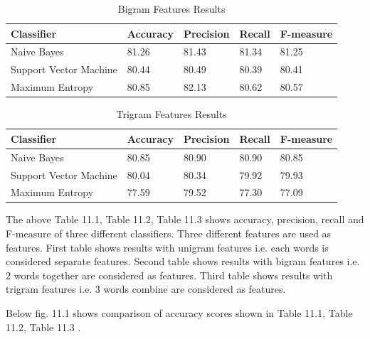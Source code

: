 \documentclass[oneside,a4paper,12pt]{pictreport}
\begin{document}
\begin{table}[h!]
\centering
\caption{Bigram Features Results}
\label{my-label}
\begin{tabular}{|l|l|l|l|l|}
\hline
\textbf{Classifier} & \textbf{Accuracy} & \textbf{Precision} & \textbf{Recall} & \textbf{F-measure}\\ \hline
Naive Bayes          & 81.26  & 81.43 & 81.34 & 81.25                   \\ \hline
Support Vector Machine          & 80.44  & 80.49 & 80.39 & 80.41                   \\ \hline
Maximum Entropy          & 80.85  & 82.13 & 80.62 & 80.57 \\ \hline
\end{tabular}
\end{table}





\begin{table}[h!]
\centering
\caption{Trigram Features Results}
\label{my-label}
\begin{tabular}{|l|l|l|l|l|}
\hline
\textbf{Classifier} & \textbf{Accuracy} & \textbf{Precision} & \textbf{Recall} & \textbf{F-measure}\\ \hline
Naive Bayes          & 80.85  & 80.90 & 80.90 & 80.85                   \\ \hline
Support Vector Machine          & 80.04  & 80.34 & 79.92 & 79.93                   \\ \hline
Maximum Entropy          & 77.59  & 79.52 & 77.30 & 77.09 \\ \hline
\end{tabular}
\end{table}

\vspace{5mm}
\par The above Table 11.1, Table 11.2, Table 11.3 shows accuracy, precision, recall and F-measure
of three different classifiers. Three different features are used as features.
First table shows results with unigram features i.e. each words is considered separate features.
Second table shows results with bigram features i.e. 2 words together are considered as features.
Third table shows results with trigram features i.e. 3 words combine are considered as features.

\vspace{5mm}
\newpage
\par Below fig. 11.1 shows comparison of accuracy scores shown in Table 11.1, Table 11.2, Table 11.3 .
\end{document}
